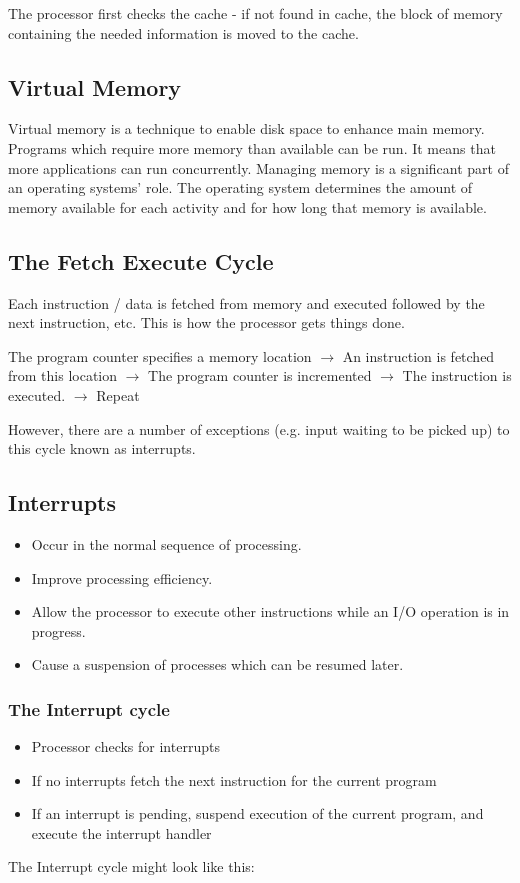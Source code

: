 \documentclass[10pt,a4paper,openany]{book}
\begin{document}
    The processor first checks the cache - if not found in cache, the block of memory containing the needed information is moved to the cache.

    \subsection{Virtual Memory}
    Virtual memory is a technique to enable disk space to enhance main memory. Programs which require more memory than available can be run. It means that more applications can run concurrently. Managing memory is a significant part of an operating systems’ role. The operating system determines the amount of memory available for each activity and for how long that memory is available.

    \subsection{The Fetch Execute Cycle}
    Each instruction / data is fetched from memory and executed followed by the next instruction, etc. This is how the processor gets things done.

    The program counter specifies a memory location $\rightarrow$ An instruction is fetched from this location $\rightarrow$ The program counter is incremented $\rightarrow$ The instruction is executed. $\rightarrow$ Repeat

    However, there are a number of exceptions (e.g. input waiting to be picked up) to this cycle known as interrupts.

    \subsection{Interrupts}
    \begin{itemize}
    \item Occur in the normal sequence of processing.
    \item Improve processing efficiency.
    \item Allow the processor to execute other instructions while an I/O operation is in progress.
    \item Cause a suspension of processes which can be resumed later.
    \end{itemize}

    \subsubsection*{The Interrupt cycle}
    \begin{itemize}
    \item Processor checks for interrupts
    \item If no interrupts fetch the next instruction for the current program
    \item If an interrupt is pending, suspend execution of the current program, and execute the interrupt handler
    \end{itemize}
    The Interrupt cycle might look like this:
\end{document}
